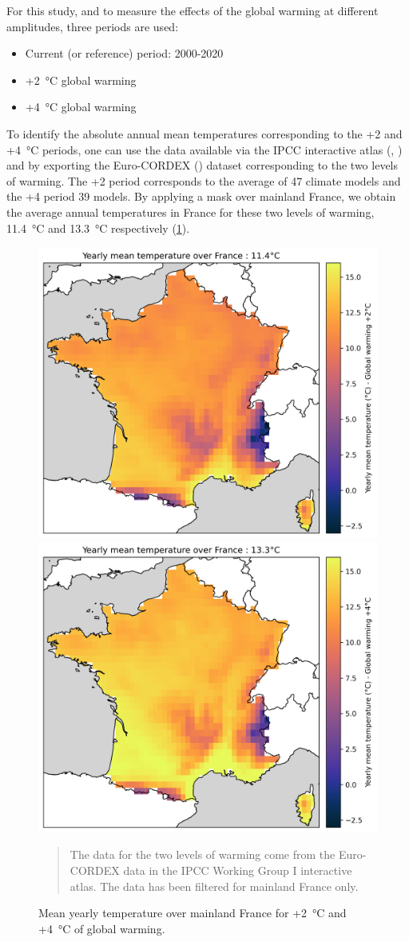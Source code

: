 \documentclass[11pt]{article}
\begin{document}
        For this study, and to measure the effects of the global warming at different amplitudes, three periods are used:
        \begin{itemize}
            \item Current (or reference) period: 2000-2020
            \item +\SI{2}{\celsius} global warming
            \item +\SI{4}{\celsius} global warming
        \end{itemize}
        To identify the absolute annual mean temperatures corresponding to the +2 and +\SI{4}{\celsius} periods, one can use the data available via the IPCC interactive atlas (\cite{ipcc_climate_2021}, \cite{iturbide_implementation_2022}) and by exporting the Euro-CORDEX (\cite{jacob_euro-cordex_2014}) dataset corresponding to the two levels of warming. The +2 period corresponds to the average of 47 climate models and the +4 period 39 models. By applying a mask over mainland France, we obtain the average annual temperatures in France for these two levels of warming, \SI{11.4}{\celsius} and \SI{13.3}{\celsius} respectively (\ref{fig:gw24}).\\

        \begin{figure}[ht]
            \centering
            \includegraphics[width=0.49\columnwidth]{figures/mean_yearly_temperature_france_gw2deg.png}
            \includegraphics[width=0.49\columnwidth]{figures/mean_yearly_temperature_france_gw4deg.png}
            \caption{\label{fig:gw24} Mean yearly temperature over mainland France for +\SI{2}{\celsius} and +\SI{4}{\celsius} of global warming.}
            \begin{quote}
                \vspace{-2mm}
                \small\noindent
                The data for the two levels of warming come from the Euro-CORDEX data in the IPCC Working Group I interactive atlas. The data has been filtered for mainland France only.
              \end{quote}
        \end{figure}
\end{document}
